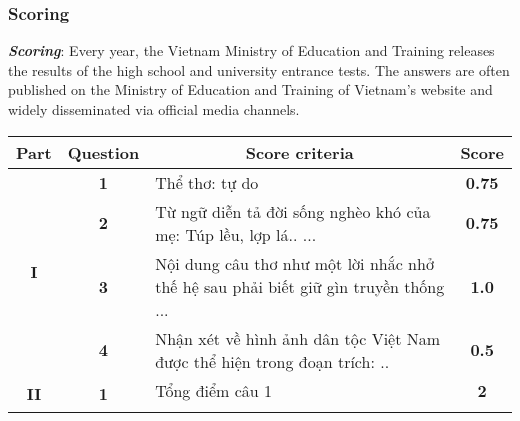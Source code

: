 \documentclass{article}
\begin{document}
{\begin{mdframed}[linewidth=1pt,linecolor=red]
		
	\end{mdframed}
	
	\subsubsection{Scoring}
	\label{VNHSGE_Lit_S}
	
	\textit{\textbf{Scoring}}: Every year, the Vietnam Ministry of Education and Training releases the results of the high school and university entrance tests. The answers are often published on the Ministry of Education and Training of Vietnam's website and widely disseminated via official media channels.
	
	
	\begingroup
	\renewcommand{\arraystretch}{1.25} 

	\begin{tabular}{|c|c|l|c|}
		\hline
		\textbf{Part}              & \textbf{Question}           & \multicolumn{1}{c|}{\textbf{Score criteria}}                                                                                                                                              & \textbf{Score}            \\ \hline
		\multirow{4}{*}{\textbf{I}}   & \textbf{1}                  & Thể thơ: tự do                                                                                                                                                                     & \textbf{0.75}             \\ \cline{2-4} 
		& \textbf{2}                  & Từ ngữ diễn tả đời sống nghèo khó của mẹ: Túp lều, lợp lá.. ...                                                                                                                   & \textbf{0.75}             \\ \cline{2-4} 
		& \textbf{3}                  & Nội dung câu thơ như một lời nhắc nhở thế hệ sau phải biết giữ gìn truyền thống ...                                                                                                                                                & \textbf{1.0}              \\ \cline{2-4} 
		& \textbf{4}                  & Nhận xét về hình ảnh dân tộc Việt Nam được thể hiện trong đoạn trích: ..                                                                                                         & \textbf{0.5}              \\ \hline
		\multirow{12}{*}{\textbf{II}} & \multirow{6}{*}{\textbf{1}} & Tổng điểm câu 1 & \textbf{2}                \\ \cline{3-4} 

\end{tabular}}
\end{document}
